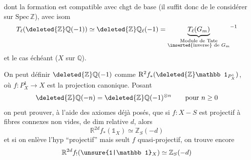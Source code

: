 dont la formation est compatible avec chgt %
de base (il suffit donc de le considérer %
sur $\mathrm{Spec}\,\mathbb Z$), avec  isom %
\[
T_\ell(\deleted{\mathbb Z}\mathbb Q(-1))\simeq\deleted{\mathbb Z}\mathbb Q_\ell(-1)={\underbrace{T_\ell(G_m)}_{\substack{\text{Module de Tate}\\\text{\inserted{inverse} de }G_m}}}^{-1} %
\]
et le cas échéant ($X$ sur $\mathbb Q$). %

On peut définir $\deleted{\mathbb Z}\mathbb Q(-1)$ comme %
$\mathrm R^2 f_*(\deleted{\mathbb Z}\mathbb 1_{P^1_X})$, où $f:P_X^1\longrightarrow X$ est la %
projection canonique. Posant %
\[
\deleted{\mathbb Z}\mathbb Q(-n)=\deleted{\mathbb Z}\mathbb Q(-1)^{\otimes n}\qquad\text{pour }n\geq0 %
\]
on peut prouver, à l'aide des %
axiomes déjà posés, que si $f:X-S$ %
est  projectif à fibres  connexes non vides, %
 de dim relative $d$, alors %
\[
\mathbb R^{2d}f_*(\mathbb 1_X)\simeq\mathbb Z_S(-d) %
\]
et si on enlève l'hyp ``projectif'' mais %
seult $f$ quasi-projectif, on trouve encore %
\[
\mathbb R^{2d} f_!(\unsure{1|\mathbb 1}_X)\simeq\mathbb Z_S(-d) %
\]

